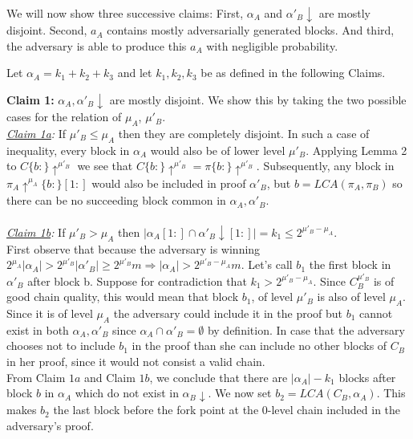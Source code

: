 We will now show three successive claims: First, $\alpha_A$ and $\alpha'_B \downarrow$
are mostly disjoint. Second, $a_A$ contains mostly adversarially generated blocks.
And third, the adversary is able to produce this $a_A$ with negligible probability.

Let $\alpha_A = k_1 + k_2 + k_3$ and let $k_1, k_2, k_3$ be as defined in the
following Claims.

\textbf{Claim 1:} $\alpha_A, \alpha'_B\downarrow$ are mostly disjoint. We show
this by taking the two possible cases for the relation of $\mu_A$, $\mu'_B$.\\
\textit{\underline{Claim 1a}:} If $\mu'_B \leq \mu_A$ then they are completely
disjoint. In such a case of inequality, every block in $\alpha_A$ would also be
of lower level $\mu'_B$. Applying Lemma 2 to $C\{b:\}\uparrow^{\mu'_B}$  we see
that $C\{b:\}\uparrow^{\mu'_B} = \pi\{b:\}\uparrow^{\mu'_B}$. Subsequently, any
block in $\pi_A\uparrow^{\mu_A}\{b:\}[1:]$ would also be included in proof
$\alpha'_B$, but $b=LCA(\pi_A, \pi_B)$ so there can be no succeeding block
common in $\alpha_A, \alpha'_B$. \\
\\
\textit{\underline{Claim 1b}:} If  $\mu'_B > \mu_A$ then $\vert \alpha_A[1:] 
\cap \alpha'_B\downarrow[1:] \vert = k_1 \leq 2^{\mu'_B - \mu_A}$.\\
First observe that because the adversary is winning $2^{\mu_A} \vert \alpha_A \vert 
> 2^{\mu'_B} \vert \alpha'_B \vert \geq 2^{\mu'_B} m \Rightarrow \vert \alpha_A \vert 
> 2^{\mu'_B - \mu_A}m$.
Let's call $b_1$ the first block in $\alpha'_B$ after block b.
Suppose for contradiction that $k_1 > 2^{\mu'_B - \mu_A}$.  Since $C_B^{\mu'_B}$ is
of good chain quality, this would mean that block $b_1$, of level $\mu'_B$ is also
of level $\mu_A$. Since it is of level $\mu_A$ the adversary could include it in
the proof but $b_1$ cannot exist in both $\alpha_A, \alpha'_B$ since $\alpha_A
\cap \alpha'_B = \emptyset$ by definition. In case that the adversary chooses not
to include $b_1$ in the proof than she can include no other blocks of $C_B$ in
her proof, since it would not consist a valid chain.  \\


From Claim $1a$ and Claim $1b$, we conclude that there are $\vert \alpha_A
\vert - k_1$ blocks after block $b$ in $\alpha_A$ which do not exist in
$\alpha_B\downarrow$. We now set $b_2 = LCA(C_B, \alpha_A)$. This makes $b_2$
the last block before the fork point at the 0-level chain included in the adversary's proof.\\


